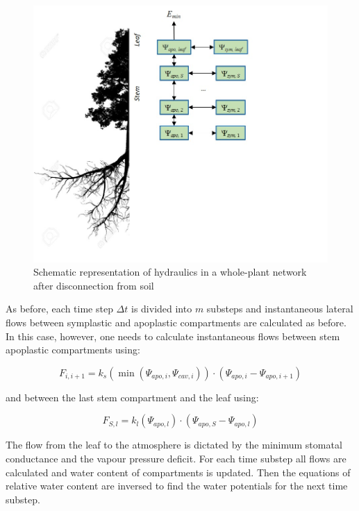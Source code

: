 \documentclass[]{book}
\begin{document}
\begin{figure}

{\centering \includegraphics[width=0.8\linewidth]{hydraulics_disc} 

}

\caption{Schematic representation of hydraulics in a whole-plant network after disconnection from soil}\label{fig:unnamed-chunk-70}
\end{figure}

As before, each time step \(\Delta t\) is divided into \(m\) substeps
and instantaneous lateral flows between symplastic and apoplastic
compartments are calculated as before. In this case, however, one needs
to calculate instantaneous flows between stem apoplastic compartments
using:

\begin{equation}
F_{i, i+1} = k_{s}(\min(\Psi_{apo,i}, \Psi_{cav, i})) \cdot (\Psi_{apo, i} - \Psi_{apo, i+1})
\end{equation}

and between the last stem compartment and the leaf using:

\begin{equation}
F_{S, l} = k_{l}(\Psi_{apo, l}) \cdot (\Psi_{apo, S} - \Psi_{apo, l})
\end{equation}

The flow from the leaf to the atmosphere is dictated by the minimum
stomatal conductance and the vapour pressure deficit. For each time
substep all flows are calculated and water content of compartments is
updated. Then the equations of relative water content are inversed to
find the water potentials for the next time substep.
\end{document}
